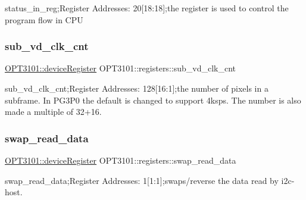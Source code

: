 status\+\_\+in\+\_\+reg;Register Addresses\+: 20\mbox{[}18\+:18\mbox{]};the register is used to control the program flow in C\+PU 

\mbox{\label{class_o_p_t3101_1_1registers_abc883ba2fcc4156c6e28e3b673de0a1a}} 
\subsubsection{\texorpdfstring{sub\+\_\+vd\+\_\+clk\+\_\+cnt}{sub\_vd\_clk\_cnt}}
{\footnotesize\ttfamily \mbox{\hyperlink{class_o_p_t3101_1_1device_register}{O\+P\+T3101\+::device\+Register}} O\+P\+T3101\+::registers\+::sub\+\_\+vd\+\_\+clk\+\_\+cnt}



sub\+\_\+vd\+\_\+clk\+\_\+cnt;Register Addresses\+: 128\mbox{[}16\+:1\mbox{]};the number of pixels in a subframe. In P\+G3\+P0 the default is changed to support 4ksps. The number is also made a multiple of 32+16. 

\mbox{\label{class_o_p_t3101_1_1registers_a23607ef6535360d4ff1264f6249b65c0}} 
\subsubsection{\texorpdfstring{swap\+\_\+read\+\_\+data}{swap\_read\_data}}
{\footnotesize\ttfamily \mbox{\hyperlink{class_o_p_t3101_1_1device_register}{O\+P\+T3101\+::device\+Register}} O\+P\+T3101\+::registers\+::swap\+\_\+read\+\_\+data}



swap\+\_\+read\+\_\+data;Register Addresses\+: 1\mbox{[}1\+:1\mbox{]};swaps/reverse the data read by i2c-\/host. 

\mbox{\label{class_o_p_t3101_1_1registers_af4ee9a8bd2c03f0045edee01b1a568ac}} 
